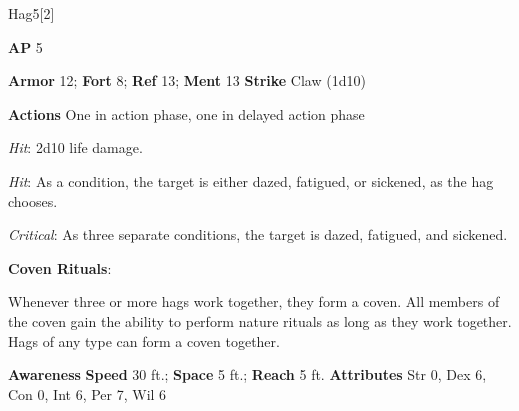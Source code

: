 \begin{monsection}[Green]{Hag}{5}[2]
\vspace{-1em}\vspace{-1em}
\begin{spellcontent}
\begin{spelltargetinginfo}
{\textbf{AP} 5}

\pari \textbf{Armor} 12;
\textbf{Fort} 8;
\textbf{Ref} 13;
\textbf{Ment} 13
\pari \textbf{Strike} Claw  (1d10)


\pari \textbf{Actions} One in action phase, one in delayed action phase
\end{spelltargetinginfo}


\begin{spelleffects}

\pari

\par


\par \textit{Hit}: 2d10 life damage.


\vspace{0.5em}
\pari

\par


\par \textit{Hit}:
As a condition, the target is either dazed, fatigued, or sickened, as the hag chooses.

\par \textit{Critical}: As three separate conditions, the target is dazed, fatigued, and sickened.

\vspace{0.5em}
\pari
\textbf{Coven Rituals}:

Whenever three or more hags work together, they form a coven.
All members of the coven gain the ability to perform nature rituals as long as they work together.
Hags of any type can form a coven together.




\end{spelleffects}

\end{spellcontent}

\begin{monsterfooter}
\pari \textbf{Awareness} 
\pari \textbf{Speed} 30 ft.;
\textbf{Space} 5 ft.;
\textbf{Reach} 5 ft.
\pari \textbf{Attributes}
Str 0,
Dex 6,
Con 0,
Int 6,
Per 7,
Wil 6
\end{monsterfooter}
\end{monsection}



